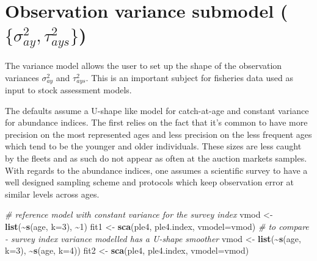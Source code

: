 \documentclass[
]{book}
\newenvironment{Shaded}{\begin{snugshade}}{\end{snugshade}}
\newcommand{\AttributeTok}[1]{\textcolor[rgb]{0.13,0.29,0.53}{#1}}
\newcommand{\CommentTok}[1]{\textcolor[rgb]{0.56,0.35,0.01}{\textit{#1}}}
\newcommand{\DecValTok}[1]{\textcolor[rgb]{0.00,0.00,0.81}{#1}}
\newcommand{\FunctionTok}[1]{\textcolor[rgb]{0.13,0.29,0.53}{\textbf{#1}}}
\newcommand{\NormalTok}[1]{#1}
\newcommand{\OtherTok}[1]{\textcolor[rgb]{0.56,0.35,0.01}{#1}}
\newcommand{\SpecialCharTok}[1]{\textcolor[rgb]{0.81,0.36,0.00}{\textbf{#1}}}
\begin{document}
\hypertarget{observation-variance-submodel-sigma2_ay-tau2_ays}{%
\section{\texorpdfstring{Observation variance submodel (\(\{\sigma^2_{ay}, \tau^2_{ays}\}\))}{Observation variance submodel (\textbackslash\{\textbackslash sigma\^{}2\_\{ay\}, \textbackslash tau\^{}2\_\{ays\}\textbackslash\})}}\label{observation-variance-submodel-sigma2_ay-tau2_ays}}

The variance model allows the user to set up the shape of the observation variances \(\sigma^2_{ay}\) and \(\tau^2_{ays}\). This is an important subject for fisheries data used as input to stock assessment models.

The defaults assume a U-shape like model for catch-at-age and constant variance for abundance indices. The first relies on the fact that it's common to have more precision on the most represented ages and less precision on the less frequent ages which tend to be the younger and older individuals. These sizes are less caught by the fleets and as such do not appear as often at the auction markets samples. With regards to the abundance indices, one assumes a scientific survey to have a well designed sampling scheme and protocols which keep observation error at similar levels across ages.

\begin{Shaded}
\begin{Highlighting}[]
\CommentTok{\# reference model with constant variance for the survey index}
\NormalTok{vmod }\OtherTok{\textless{}{-}} \FunctionTok{list}\NormalTok{(}\SpecialCharTok{\textasciitilde{}}\FunctionTok{s}\NormalTok{(age, }\AttributeTok{k=}\DecValTok{3}\NormalTok{), }\SpecialCharTok{\textasciitilde{}}\DecValTok{1}\NormalTok{)}
\NormalTok{fit1 }\OtherTok{\textless{}{-}} \FunctionTok{sca}\NormalTok{(ple4, ple4.index, }\AttributeTok{vmodel=}\NormalTok{vmod)}
\CommentTok{\# to compare {-} survey index variance modelled has a U{-}shape smoother}
\NormalTok{vmod }\OtherTok{\textless{}{-}} \FunctionTok{list}\NormalTok{(}\SpecialCharTok{\textasciitilde{}}\FunctionTok{s}\NormalTok{(age, }\AttributeTok{k=}\DecValTok{3}\NormalTok{), }\SpecialCharTok{\textasciitilde{}}\FunctionTok{s}\NormalTok{(age, }\AttributeTok{k=}\DecValTok{4}\NormalTok{))}
\NormalTok{fit2 }\OtherTok{\textless{}{-}} \FunctionTok{sca}\NormalTok{(ple4, ple4.index, }\AttributeTok{vmodel=}\NormalTok{vmod)}
\end{Highlighting}
\end{Shaded}
\end{document}
